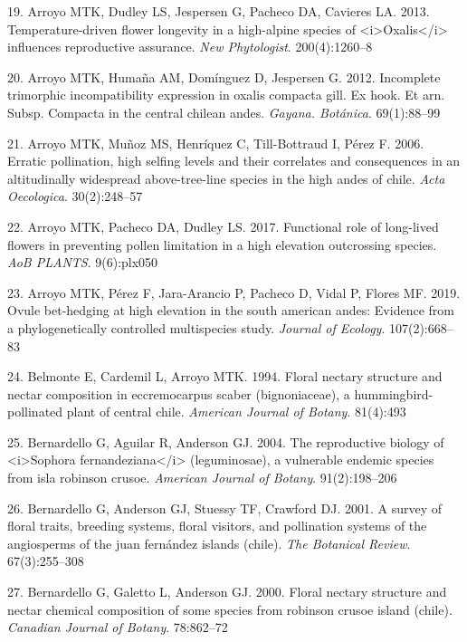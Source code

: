 \documentclass[
]{article}
\begin{document}
\leavevmode\hypertarget{ref-RN106}{}%
19. Arroyo MTK, Dudley LS, Jespersen G, Pacheco DA, Cavieres LA. 2013.
Temperature-driven flower longevity in a high-alpine species of
\textless i\textgreater Oxalis\textless/i\textgreater{} influences
reproductive assurance. \emph{New Phytologist}. 200(4):1260--8

\leavevmode\hypertarget{ref-RN105}{}%
20. Arroyo MTK, Humaña AM, Domínguez D, Jespersen G. 2012. Incomplete
trimorphic incompatibility expression in oxalis compacta gill. Ex hook.
Et arn. Subsp. Compacta in the central chilean andes. \emph{Gayana.
Botánica}. 69(1):88--99

\leavevmode\hypertarget{ref-RN103}{}%
21. Arroyo MTK, Muñoz MS, Henríquez C, Till-Bottraud I, Pérez F. 2006.
Erratic pollination, high selfing levels and their correlates and
consequences in an altitudinally widespread above-tree-line species in
the high andes of chile. \emph{Acta Oecologica}. 30(2):248--57

\leavevmode\hypertarget{ref-RN17}{}%
22. Arroyo MTK, Pacheco DA, Dudley LS. 2017. Functional role of
long-lived flowers in preventing pollen limitation in a high elevation
outcrossing species. \emph{AoB PLANTS}. 9(6):plx050

\leavevmode\hypertarget{ref-RN18}{}%
23. Arroyo MTK, Pérez F, Jara-Arancio P, Pacheco D, Vidal P, Flores MF.
2019. Ovule bet-hedging at high elevation in the south american andes:
Evidence from a phylogenetically controlled multispecies study.
\emph{Journal of Ecology}. 107(2):668--83

\leavevmode\hypertarget{ref-RN19}{}%
24. Belmonte E, Cardemil L, Arroyo MTK. 1994. Floral nectary structure
and nectar composition in eccremocarpus scaber (bignoniaceae), a
hummingbird-pollinated plant of central chile. \emph{American Journal of
Botany}. 81(4):493

\leavevmode\hypertarget{ref-RN21}{}%
25. Bernardello G, Aguilar R, Anderson GJ. 2004. The reproductive
biology of \textless i\textgreater Sophora
fernandeziana\textless/i\textgreater{} (leguminosae), a vulnerable
endemic species from isla robinson crusoe. \emph{American Journal of
Botany}. 91(2):198--206

\leavevmode\hypertarget{ref-RN1}{}%
26. Bernardello G, Anderson GJ, Stuessy TF, Crawford DJ. 2001. A survey
of floral traits, breeding systems, floral visitors, and pollination
systems of the angiosperms of the juan fernández islands (chile).
\emph{The Botanical Review}. 67(3):255--308

\leavevmode\hypertarget{ref-RN20}{}%
27. Bernardello G, Galetto L, Anderson GJ. 2000. Floral nectary
structure and nectar chemical composition of some species from robinson
crusoe island (chile). \emph{Canadian Journal of Botany}. 78:862--72
\end{document}
